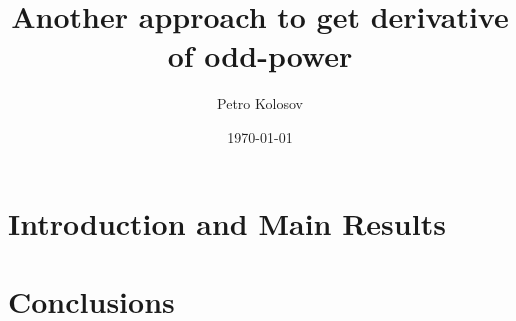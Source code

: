 \documentclass[12pt,letterpaper,oneside,reqno]{amsart}
\title[Another approach to get derivative of odd-power]
{Another approach to get derivative of odd-power}
\author[Petro Kolosov]{Petro Kolosov}
\date{\today}
\begin{document}
    \begin{abstract}
        
    \end{abstract}

    \maketitle

    \tableofcontents


    \section{Introduction and Main Results} \label{sec:introduction}
    


    \section{Conclusions}\label{sec:conclusions}
    

    
    
\end{document}
